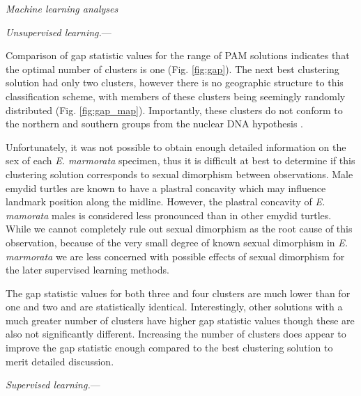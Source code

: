 \documentclass[12pt,letterpaper]{article}\usepackage{graphicx, color}
\renewcommand{\subsection}[1]{%
\bigskip
\begin{center}
\begin{large}
\normalfont\itshape #1
\end{large}
\end{center}}
\renewcommand{\subsubsection}[1]{%
\vspace{2ex}
\noindent
\textit{#1.}---}
\begin{document}


\subsection{Machine learning analyses}
\subsubsection{Unsupervised learning}

Comparison of gap statistic values for the range of PAM solutions indicates that the optimal number of clusters is one (Fig. \ref{fig:gap}). The next best clustering solution had only two clusters, however there is no geographic structure to this classification scheme, with members of these clusters being seemingly randomly distributed (Fig. \ref{fig:gap_map}). Importantly, these clusters do not conform to the northern and southern groups from the nuclear DNA hypothesis \citep{Spinks2010}.

Unfortunately, it was not possible to obtain enough detailed information on the sex of each \textit{E. marmorata} specimen, thus it is difficult at best to determine if this clustering solution corresponds to sexual dimorphism between observations. Male emydid turtles are known to have a plastral concavity which may influence landmark position along the midline. However, the plastral concavity of \textit{E. mamorata} males is considered less pronounced than in other emydid turtles. While we cannot completely rule out sexual dimorphism as the root cause of this observation, because of the very small degree of known sexual dimorphism in \textit{E. marmorata} we are less concerned with possible effects of sexual dimorphism for the later supervised learning methods. 

The gap statistic values for both three and four clusters are much lower than for one and two and are statistically identical. Interestingly, other solutions with a much greater number of clusters have higher gap statistic values though these are also not significantly different. Increasing the number of clusters does appear to improve the gap statistic enough compared to the best clustering solution to merit detailed discussion.


\subsubsection{Supervised learning}
\end{document}
